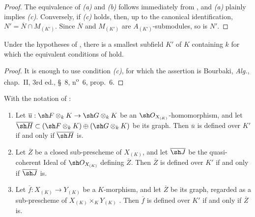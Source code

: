 \begin{proof}
The equivalence of \emph{(a)} and \emph{(b)} follows immediately from
, and \emph{(a)} plainly implies \emph{(c)}.
Conversely, if \emph{(c)} holds, then, up to the canonical
identification, $N'=\overline N\cap M_{(K')}$.
Since $\overline N$ and $M_{(K')}$ are $A_{(K')}$-submodules, so is
$N'$.
\end{proof}

\begin{corollary}[4.8.7]
\label{IV.4.8.7}
Under the hypotheses of , there is a smallest subfield
$K'$ of $K$ containing $k$ for which the equivalent conditions of
 hold.
\end{corollary}

\begin{proof}
It is enough to use condition \emph{(c)}, for which the assertion is
Bourbaki, \emph{Alg.}, chap.~II, 3rd ed., \S~8,
n\textsuperscript{o}~6, prop.~6.
\end{proof}

\begin{lemma}[4.8.8]
\label{IV.4.8.8}
With the notation of :
\begin{enumerate}
\item[\rm(i)]
\label{IV.4.8.8.i}
Let
$\overline u:\sh F\otimes_kK\to\sh G\otimes_kK$ be an
$\sh O_{X_{(K)}}$-homomorphism, and let $\overline{\sh H}\subset
(\sh F\otimes_kK)\oplus(\sh G\otimes_kK)$
be its graph.
Then $\overline u$ is defined over $K'$ if and only if
$\overline{\sh H}$ is.

\item[\rm(ii)]
\label{IV.4.8.8.ii}
Let $\overline Z$ be a closed sub-prescheme of $X_{(K)}$, and let
$\overline{\sh J}$ be the quasi-coherent Ideal of
$\sh O_{X_{(K)}}$ defining $\overline Z$.
Then $\overline Z$ is defined over $K'$ if and only if
$\overline{\sh J}$ is.

\item[\rm\textup{(iii)}]
\label{IV.4.8.8.iii}
Let $\overline f:X_{(K)}\to Y_{(K)}$ be a $K$-morphism, and let
$\overline Z$ be its graph, regarded as a sub-prescheme of
$X_{(K)}\times_KY_{(K)}$ .
Then $\overline f$ is defined over $K'$ if and only if
$\overline Z$ is.
\end{enumerate}
\end{lemma}

